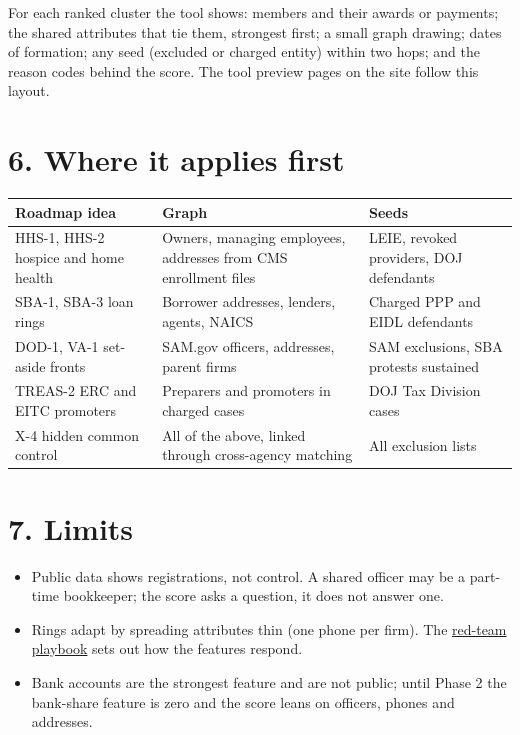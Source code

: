\documentclass[letterpaper,11pt]{article}
\providecommand{\tightlist}{\setlength{\itemsep}{0pt}\setlength{\parskip}{0pt}}
\begin{document}
For each ranked cluster the tool shows: members and their awards or
payments; the shared attributes that tie them, strongest first; a small
graph drawing; dates of formation; any seed (excluded or charged entity)
within two hops; and the reason codes behind the score. The tool preview
pages on the site follow this layout.

\hypertarget{where-it-applies-first}{%
\section*{6. Where it applies first}\label{where-it-applies-first}}

\begingroup\small\setlength{\tabcolsep}{4pt}\renewcommand{\arraystretch}{1.25}
\begin{longtable}[l]{@{}>{\raggedright\arraybackslash}p{}>{\raggedright\arraybackslash}p{}>{\raggedright\arraybackslash}p{}@{}}
\rowcolor{coolblack}\leavevmode\color{white}\bfseries Roadmap idea & \leavevmode\color{white}\bfseries Graph & \leavevmode\color{white}\bfseries Seeds \\
\endhead
HHS-1, HHS-2 hospice and home health & Owners, managing employees, addresses from CMS enrollment files & LEIE, revoked providers, DOJ defendants \\
SBA-1, SBA-3 loan rings & Borrower addresses, lenders, agents, NAICS & Charged PPP and EIDL defendants \\
DOD-1, VA-1 set-aside fronts & SAM.gov officers, addresses, parent firms & SAM exclusions, SBA protests sustained \\
TREAS-2 ERC and EITC promoters & Preparers and promoters in charged cases & DOJ Tax Division cases \\
X-4 hidden common control & All of the above, linked through cross-agency matching & All exclusion lists \\
\end{longtable}\endgroup

\hypertarget{limits}{%
\section*{7. Limits}\label{limits}}

\begin{itemize}
\tightlist
\item
  Public data shows registrations, not control. A shared officer may be
  a part-time bookkeeper; the score asks a question, it does not answer
  one.
\item
  Rings adapt by spreading attributes thin (one phone per firm). The
  \href{red_team.pdf}{red-team playbook} sets out how the features
  respond.
\item
  Bank accounts are the strongest feature and are not public; until
  Phase 2 the bank-share feature is zero and the score leans on
  officers, phones and addresses.
\end{itemize}
\end{document}
